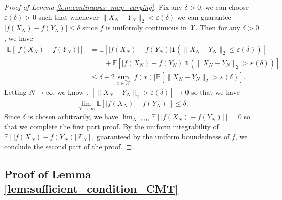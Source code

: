 \documentclass[12pt]{article}
\def\P{\mathbb{P}}
\def\P{\mathbb{P}}
\newcommand{\E}{\mathbb E}								%
\renewcommand{\P}{\mathbb{P}}							%
\begin{document}
\begin{proof}[Proof of Lemma \ref{lem:continuous_map_varying}]
	Fix any $\delta>0$, we can choose $\varepsilon(\delta)>0$ such that whenever $\|X_N-Y_N\|_2<\varepsilon(\delta)$ we can guarantee $|f(X_N)-f(Y_N)|\leq \delta$ since $f$ is uniformly continuous in $\mathcal{X}$. Then for any $\delta>0$, we have 
	\begin{align*}
		\E[\left|f(X_N)-f(Y_N)\right|]
		&
		= \E\left[|f(X_N)-f(Y_N)|\mathbf{1}(\|X_N-Y_N\|_2\leq \varepsilon(\delta))\right]\\
		&
		\qquad +\E\left[|f(X_N)-f(Y_N)|\mathbf{1}(\|X_N-Y_N\|_2>\varepsilon(\delta))\right]\\
		&
		\leq \delta+2\sup_{x\in\mathcal{X}}|f(x)|\P[\|X_N-Y_N\|_2>\varepsilon(\delta)].
	\end{align*}
	Letting $N\rightarrow\infty$, we know $\P[\|X_N-Y_N\|_2>\varepsilon(\delta)]\rightarrow0$ so that we have 
	\begin{align*}
		\lim_{N\rightarrow\infty}\E[\left|f(X_N)-f(Y_N)\right|]\leq \delta.
	\end{align*}
	Since $\delta$ is chosen arbitrarily, we have $\lim_{N\rightarrow\infty}\E[\left|f(X_N)-f(Y_N)\right|]=0$ so that we complete the first part proof. By the uniform integrability of $\E[|f(X_N)-f(Y_N)|\mathcal{F}_N]$, guaranteed by the uniform boundedness of $f$, we conclude the second part of the proof.
\end{proof}



\subsection{Proof of Lemma \ref{lem:sufficient_condition_CMT}}
\end{document}
